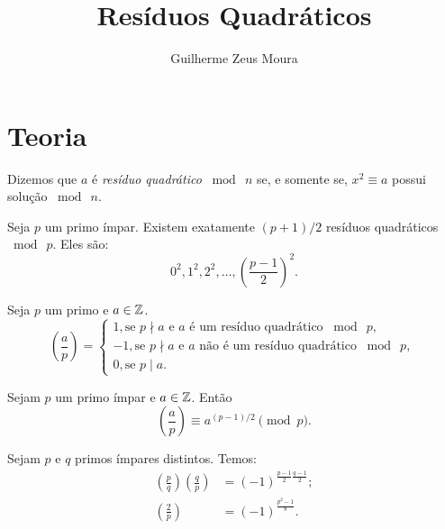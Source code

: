 \documentclass[10pt,a4paper]{article}
\title{Resíduos Quadráticos}
\author{Guilherme Zeus Moura}
\newcommand{\leg}[2]{\left(\frac{#1}{#2}\right)}
\newcommand{\tmod}[1]{\bmod{\ #1}}
\begin{document}
	
	\zeustitle
	\section{Teoria}
	\begin{defn}
		Dizemos que $a$ é \textit{resíduo quadrático} $\tmod{n}$ se, e somente se, $x^2 \equiv a$ possui solução $\tmod{n}$.
	\end{defn}
	\begin{prop}
		Seja $p$ um primo ímpar. Existem exatamente $(p+1)/2$ resíduos quadráticos $\tmod{p}$. Eles são:
		$$ 0^2,  1^2, 2^2, \dots, \left( \frac{p-1}{2} \right)^2.$$
	\end{prop}
	\begin{defn}
		Seja $p$ um primo e $a \in \mathbb{Z}$.
		$$\leg{a}{p} =
		\begin{cases}
			1,  \text{se $p \nmid a$ e $a$ é um resíduo quadrático $\tmod{p}$, }\\
			-1, \text{se $p \nmid a$  e $a$ não é um resíduo quadrático $\tmod{p}$, }\\
			0,  \text{se $p \mid a$.}
		\end{cases}$$
	\end{defn}
	\begin{thm}
		Sejam $p$ um primo ímpar e $a \in \mathbb{Z}$. Então
		$$\leg{a}{p} \equiv a^{(p-1)/2}\pmod{p}.$$
	\end{thm}
	\begin{thm}
		Sejam $p$ e $q$ primos ímpares distintos. Temos:
		\begin{align*}
			\leg{p}{q} \leg{q}{p} & = (-1)^{\frac{p-1}{2}\frac{q-1}{2}};\\
			\leg{2}{p} & = (-1)^\frac{p^2 - 1}{8}.
		\end{align*}
	\end{thm}\
\end{document}
